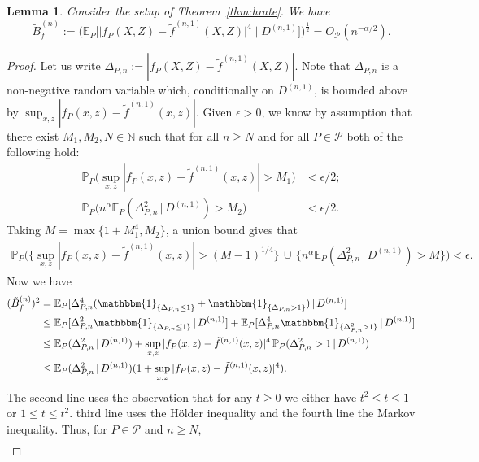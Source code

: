 \documentclass[aos]{imsart}
\newcommand{\ind}{\mathbbm{1}}
\newcommand{\pr}{\mathbb{P}}
\newcommand{\E}{\mathbb{E}}
\newcommand{\given}{\,|\,}
\newtheorem{lemma}[theorem]{Lemma}
\begin{document}
	\begin{lemma} \label{lem:eta_exists}
		Consider the setup of Theorem~\ref{thm:hrate}. We have
		\[
		\tilde{B}_f^{(n)} := \Big(\E_P\Big[ \big|f_P(X,Z)-\tilde f^{(n,1)}(X,Z)\big|^{4} \;\Big| \; D^{(n,1)} \Big]\Big)^{\frac{1}{2}} = O_{\mathcal{P}}(n^{-\alpha/2}).
		\]
	\end{lemma}
	\begin{proof}
		Let us write $\Delta_{P,n} :=|f_P(X,Z)-\tilde f^{(n,1)}(X,Z)|$. Note that $\Delta_{P,n}$ is a non-negative random variable which, conditionally on $D^{(n,1)}$, is bounded above by $\sup_{x,z}|f_P(x,z)-\tilde f^{(n,1)}(x,z)|$.
		Given $\epsilon > 0$, we know by assumption that there exist $M_1, M_2, N \in \mathbb{N}$ such that for all $n \geq N$ and for all $P \in \mathcal{P}$ both of the following hold:
        \begin{align*}
            \pr_P\big(\sup_{x,z} |f_P(x,z)-\tilde f^{(n,1)}(x,z)| > M_1\big) &< \epsilon/2;\\
            \pr_P\big(n^{\alpha} \E_P(\Delta_{P,n}^2 \given D^{(n,1)}) > M_2 \big) &< \epsilon/2.
        \end{align*}
        Taking $M= \max\big\{1+M_1^4, M_2\big\}$, a union bound gives that
		\begin{align*}
		 \pr_P\big(\big\{\sup_{x,z} |f_P(x,z)-\tilde f^{(n,1)}(x,z)| > (M-1)^{1/4}\big\}\, \cup \,  \big\{n^{\alpha} \E_P(\Delta_{P,n}^2 \given D^{(n,1)}) > M \big\}\big) < \epsilon.
		\end{align*}
		Now we have
		\begin{align*}
		(\tilde{B}_f^{(n)})^{2}  &= \E_P [\Delta_{P,n}^{4}(\ind_{\{\Delta_{P,n} \leq 1\}} +  \ind_{\{\Delta_{P,n} > 1\}}) \given D^{(n,1)} ]   \\
        &\leq \E_P [\Delta_{P,n}^{2}\ind_{\{\Delta_{P,n} \leq 1\}} \given D^{(n,1)} ] + \E_P[ \Delta_{P,n}^{4} \ind_{\{\Delta^2_{P,n} > 1\}} \given D^{(n,1)} ]   \\
		&\leq \E_P(\Delta_{P,n}^2 \given D^{(n,1)})  + \sup_{x,z} |f_P(x,z)-\tilde f^{(n,1)}(x,z)|^{4} \,\pr_P( \Delta_{P,n}^2 > 1 \given D^{(n,1)}) \\
		&\leq  \E_P(\Delta_{P,n}^2 \given D^{(n,1)}) ( 1 + \sup_{x,z} |f_P(x,z)-\tilde f^{(n,1)}(x,z)|^{4}).
		\end{align*}
		The second line uses the observation that for any $t\geq 0$ we either have $t^2\leq t\leq 1$ or $1\leq t\leq t^2$. third line uses the H\"older inequality and the fourth line the Markov inequality. Thus, for $P \in \mathcal{P}$ and $n \geq N$,
		\begin{align*}

\end{align*}
\end{proof}
\end{document}
